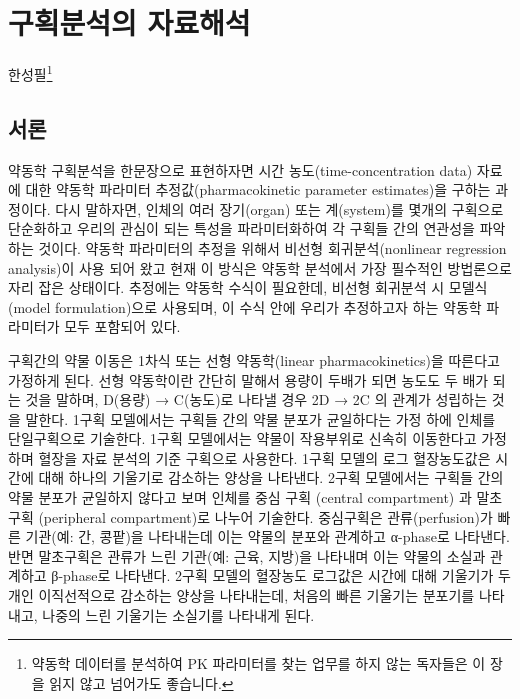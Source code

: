 \documentclass[
  11pt,
  krantz2, a4paper, twoside]{krantz}
\theoremstyle{definition}
\theoremstyle{definition}
\theoremstyle{definition}
\theoremstyle{definition}
\theoremstyle{remark}
\begin{document}
\hypertarget{ca-analysis}{%
\chapter{구획분석의 자료해석}\label{ca-analysis}}

\Large\hfill

한성필\footnote{약동학 데이터를 분석하여 PK 파라미터를 찾는 업무를 하지 않는 독자들은 이 장을 읽지 않고 넘어가도 좋습니다.}
\normalsize

\hypertarget{uxc11cuxb860-3}{%
\section{서론}\label{uxc11cuxb860-3}}

약동학 구획분석을 한문장으로 표현하자면 시간 농도(time-concentration data) 자료에 대한 약동학 파라미터 추정값(pharmacokinetic parameter estimates)을 구하는 과정이다. 
다시 말하자면, 인체의 여러 장기(organ) 또는 계(system)를 몇개의 구획으로 단순화하고 우리의 관심이 되는 특성을 파라미터화하여 각 구획들 간의 연관성을 파악하는 것이다.
약동학 파라미터의 추정을 위해서 비선형 회귀분석(nonlinear regression analysis)이 사용 되어 왔고 현재 이 방식은 약동학 분석에서 가장 필수적인 방법론으로 자리 잡은 상태이다. 
추정에는 약동학 수식이 필요한데, 비선형 회귀분석 시 모델식(model formulation)으로 사용되며, 이 수식 안에 우리가 추정하고자 하는 약동학 파라미터가 모두 포함되어 있다. 

구획간의 약물 이동은 1차식 또는 선형 약동학(linear pharmacokinetics)을 따른다고 가정하게 된다. 
선형 약동학이란 간단히 말해서 용량이 두배가 되면 농도도 두 배가 되는 것을 말하며, D(용량) → C(농도)로 나타낼 경우 2D → 2C 의 관계가 성립하는 것을 말한다.
1구획 모델에서는 구획들 간의 약물 분포가 균일하다는 가정 하에 인체를 단일구획으로 기술한다.
1구획 모델에서는 약물이 작용부위로 신속히 이동한다고 가정하며 혈장을 자료 분석의 기준 구획으로 사용한다.
1구획 모델의 로그 혈장농도값은 시간에 대해 하나의 기울기로 감소하는 양상을 나타낸다.
2구획 모델에서는 구획들 간의 약물 분포가 균일하지 않다고 보며 인체를 중심 구획 (central compartment) 과 말초구획 (peripheral compartment)로 나누어 기술한다. 
중심구획은 관류(perfusion)가 빠른 기관(예: 간, 콩팥)을 나타내는데 이는 약물의 분포와 관계하고 α-phase로 나타낸다. 
반면 말초구획은 관류가 느린 기관(예: 근육, 지방)을 나타내며 이는 약물의 소실과 관계하고 β-phase로 나타낸다. 
2구획 모델의 혈장농도 로그값은 시간에 대해 기울기가 두 개인 이직선적으로 감소하는 양상을 나타내는데, 처음의 빠른 기울기는 분포기를 나타내고, 나중의 느린 기울기는 소실기를 나타내게 된다.
\end{document}

